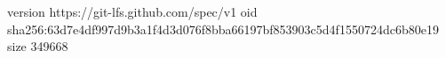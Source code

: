 version https://git-lfs.github.com/spec/v1
oid sha256:63d7e4df997d9b3a1f4d3d076f8bba66197bf853903c5d4f1550724dc6b80e19
size 349668

